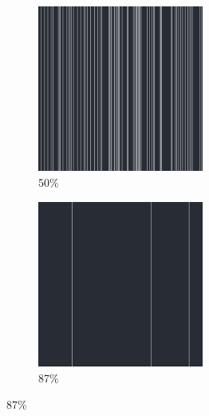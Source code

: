 \documentclass[12pt, fleqn]{report}                             %
\theoremstyle{break}                                            %
\begin{document}
\begin{figure}[ht!]
\begin{subfigure}[b]{0.4\linewidth}
          \includegraphics[width=0.6\textwidth]{Images/4/c.png}
          \caption{50\%}
        \end{subfigure}
        \begin{subfigure}[b]{0.4\linewidth}
          \includegraphics[width=0.6\textwidth]{Images/4/d.png}
          \caption{87\%}
        \end{subfigure}
      \end{figure}
\end{document}
